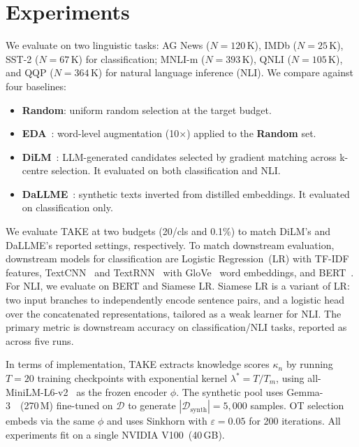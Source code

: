 \section{Experiments} \label{sec:05-experiments}
\begin{foldable} %
  We evaluate on two linguistic tasks: AG News ($N=120$\,K), IMDb ($N=25$\,K), SST-2 ($N=67$\,K) for classification; MNLI-m ($N=393$\,K), QNLI ($N=105$\,K), and QQP ($N=364$\,K) for natural language inference (NLI).
  We compare against four baselines:
  \begin{itemize}
    \item \textbf{Random}: uniform random selection at the target budget.
    \item \textbf{EDA}~\cite{wei2019eda}: word-level augmentation (10$\times$) applied to the \textbf{Random} set.
    \item \textbf{DiLM}~\cite{maekawa2024dilm}: LLM-generated candidates selected by gradient matching across k-centre selection. It evaluated on both classification and NLI.
    \item \textbf{DaLLME}~\cite{tao2024textual}: synthetic texts inverted from distilled embeddings. It evaluated on classification only.
  \end{itemize}
  We evaluate TAKE at two budgets (20/cls and 0.1\%) to match DiLM's and DaLLME's reported settings, respectively.
  To match downstream evaluation, downstream models for classification are Logistic Regression~(LR) with TF-IDF~\cite{salton1988term} features, TextCNN~\cite{kim2014convolutional} and TextRNN~\cite{liu2016recurrent} with GloVe~\cite{pennington2014glove} word embeddings, and BERT~\cite{devlin2019bert}.
  For NLI, we evaluate on BERT and Siamese LR.
  Siamese LR is a variant of LR: two input branches to independently encode sentence pairs, and a logistic head over the concatenated representations, tailored as a weak learner for NLI.
  The primary metric is downstream accuracy on classification/NLI tasks, reported as  across five runs.
\end{foldable}

\begin{foldable} %
  In terms of implementation, TAKE extracts knowledge scores $\kappa_n$ by running $T=20$ training checkpoints with exponential kernel $\lambda^* = T/T_m$, using all-MiniLM-L6-v2~\cite{wang2020minilm} as the frozen encoder $\phi$.
  The synthetic pool uses Gemma-3~\cite{kamath2025gemma}~(270\,M) fine-tuned on $\mathcal{D}$ to generate $|\mathcal{D}_\text{synth}|=5{,}000$ samples.
  OT selection embeds via the same $\phi$ and uses Sinkhorn with $\varepsilon=0.05$ for 200 iterations.
  All experiments fit on a single NVIDIA V100~(40\,GB).
\end{foldable}

